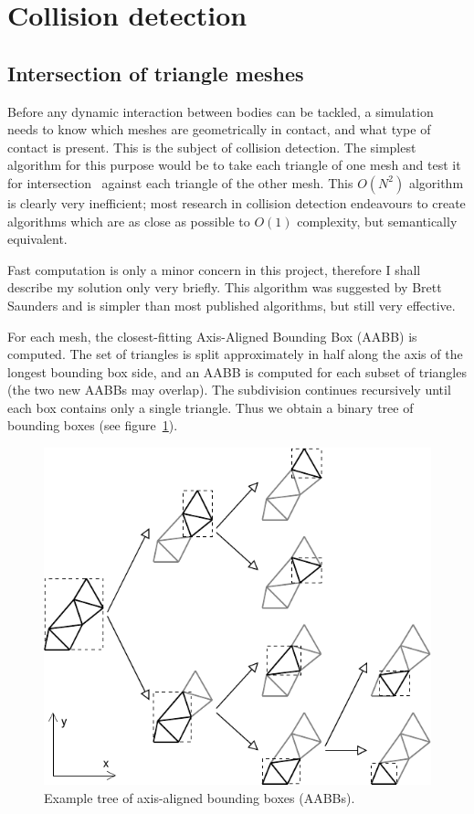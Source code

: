 \section{Collision detection\label{collisionDetection}}

\subsection{Intersection of triangle meshes\label{meshIntersection}}

Before any dynamic interaction between bodies can be tackled, a simulation needs to know which
meshes are geometrically in contact, and what type of contact is present. This is the subject
of collision detection. The simplest algorithm for this purpose would be to take each triangle
of one mesh and test it for intersection~\cite{Moeller:97} against each triangle of the other
mesh. This $O(N^2)$ algorithm is clearly very inefficient; most research in collision detection
endeavours to create algorithms which are as close as possible to $O(1)$ complexity, but
semantically equivalent.

Fast computation is only a minor concern in this project, therefore I shall describe my solution
only very briefly. This algorithm was suggested by Brett Saunders and is simpler than most
published algorithms, but still very effective.

For each mesh, the closest-fitting Axis-Aligned Bounding Box (AABB) is computed. The set of
triangles is split approximately in half along the axis of the longest bounding box side, and
an AABB is computed for each subset of triangles (the two new AABBs may overlap). The subdivision
continues recursively until each box contains only a single triangle. Thus we obtain a binary
tree of bounding boxes (see figure~\ref{collisionVolumes}).

\begin{figure}
\centerline{\includegraphics{figures/coll-volumes}}
\caption{Example tree of axis-aligned bounding boxes (AABBs).\label{collisionVolumes}}
\end{figure}

